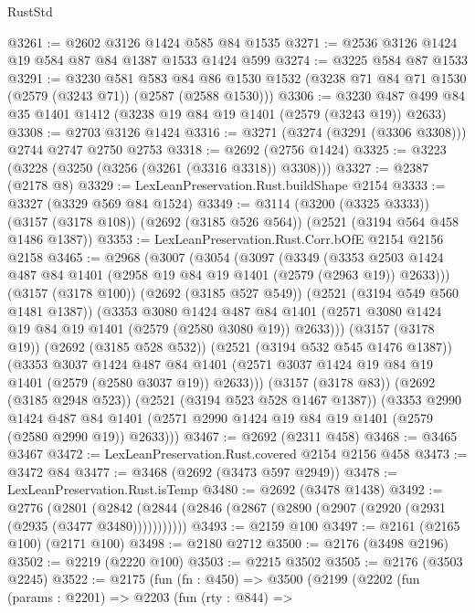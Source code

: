 \begin{lexlean}{RustStd}
\begin{coremodule}
{\begin{coremodule}
{{{{{{{{{{@3261 := @2602 @3126 @1424 @585 @84 @1535
@3271 := @2536 @3126 @1424 @19 @584 @87 @84 @1387 @1533 @1424 @599
@3274 := @3225 @584 @87 @1533
@3291 := @3230
    @581
    @583
    @84
    @86
    @1530
    @1532
    (@3238 @71 @84 @71 @1530 (@2579 (@3243 @71)) (@2587 (@2588 @1530)))
@3306 := @3230 @487 @499 @84 @35 @1401 @1412 (@3238 @19 @84 @19 @1401 (@2579 (@3243 @19)) @2633)
@3308 := @2703 @3126 @1424
@3316 := @3271 (@3274 (@3291 (@3306 @3308))) @2744 @2747 @2750 @2753
@3318 := @2692 (@2756 @1424)
@3325 := @3223 (@3228 (@3250 (@3256 (@3261 (@3316 @3318)) @3308)))
@3327 := @2387 (@2178 @8)
@3329 := LexLeanPreservation.Rust.buildShape @2154
@3333 := @3327 (@3329 @569 @84 @1524)
@3349 := @3114
    (@3200 (@3325 @3333))
    (@3157 (@3178 @108))
    (@2692 (@3185 @526 @564))
    (@2521 (@3194 @564 @458 @1486 @1387))
@3353 := LexLeanPreservation.Rust.Corr.bOfE @2154 @2156 @2158
@3465 := @2968
    (@3007
      (@3054
        (@3097
          (@3349
            (@3353 @2503 @1424 @487 @84 @1401 (@2958 @19 @84 @19 @1401 (@2579 (@2963 @19)) @2633)))
          (@3157 (@3178 @100))
          (@2692 (@3185 @527 @549))
          (@2521 (@3194 @549 @560 @1481 @1387))
          (@3353
            @3080
            @1424
            @487
            @84
            @1401
            (@2571 @3080 @1424 @19 @84 @19 @1401 (@2579 (@2580 @3080 @19)) @2633)))
        (@3157 (@3178 @19))
        (@2692 (@3185 @528 @532))
        (@2521 (@3194 @532 @545 @1476 @1387))
        (@3353
          @3037
          @1424
          @487
          @84
          @1401
          (@2571 @3037 @1424 @19 @84 @19 @1401 (@2579 (@2580 @3037 @19)) @2633)))
      (@3157 (@3178 @83))
      (@2692 (@3185 @2948 @523))
      (@2521 (@3194 @523 @528 @1467 @1387))
      (@3353
        @2990
        @1424
        @487
        @84
        @1401
        (@2571 @2990 @1424 @19 @84 @19 @1401 (@2579 (@2580 @2990 @19)) @2633)))
@3467 := @2692 (@2311 @458)
@3468 := @3465 @3467
@3472 := LexLeanPreservation.Rust.covered @2154 @2156 @458
@3473 := @3472 @84
@3477 := @3468 (@2692 (@3473 @597 @2949))
@3478 := LexLeanPreservation.Rust.isTemp
@3480 := @2692 (@3478 @1438)
@3492 := @2776
    (@2801 (@2842 (@2844 (@2846 (@2867 (@2890 (@2907 (@2920 (@2931 (@2935 (@3477 @3480)))))))))))
@3493 := @2159 @100
@3497 := @2161 (@2165 @100) (@2171 @100)
@3498 := @2180 @2712
@3500 := @2176 (@3498 @2196)
@3502 := @2219 (@2220 @100)
@3503 := @2215 @3502
@3505 := @2176 (@3503 @2245)
@3522 := @2175
    (fun (fn : @450) =>
    @3500
      (@2199
        (@2202
          (fun (params : @2201) =>
          @2203
            (fun (rty : @844) =>
}}}}}}}}}}
\end{coremodule}}
\end{coremodule}
\end{lexlean}

